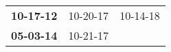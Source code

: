 \begin{supertabular}{p{0.33\columnwidth}p{0.33\columnwidth}p{0.33\columnwidth}}
 \textbf{10-17-12\textsuperscript{}} &  10-20-17\textsuperscript{} &  10-14-18\textsuperscript{} \\
 \textbf{05-03-14\textsuperscript{}} &  10-21-17\textsuperscript{} &                             \\
\end{supertabular}
